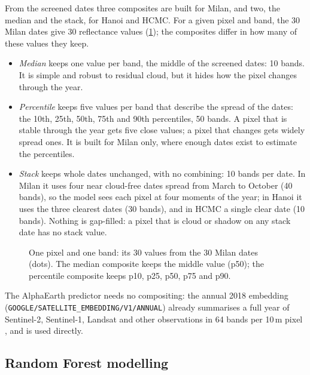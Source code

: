From the screened dates three composites are built for Milan, and two, the
median and the stack, for Hanoi and HCMC. For a given pixel and band, the 30
Milan dates give 30 reflectance values (\cref{fig:onepixel}); the composites
differ in how many of these values they keep.

\begin{itemize}
  \item \emph{Median} keeps one value per band, the middle of the screened
  dates: 10 bands. It is simple and robust to residual cloud, but it hides
  how the pixel changes through the year.
  \item \emph{Percentile} keeps five values per band that describe the
  spread of the dates: the 10th, 25th, 50th, 75th and 90th percentiles,
  50 bands. A pixel that is stable through the year gets five close values; a
  pixel that changes gets widely spread ones. It is built for Milan only,
  where enough dates exist to estimate the percentiles.
  \item \emph{Stack} keeps whole dates unchanged, with no combining: 10
  bands per date. In Milan it uses four near cloud-free dates spread from
  March to October (40 bands), so the model sees each pixel at four moments
  of the year; in Hanoi it uses the three clearest dates (30 bands), and in
  HCMC a single clear date (10 bands). Nothing is gap-filled: a pixel that is
  cloud or shadow on any stack date has no stack value.
\end{itemize}

\begin{figure}[htbp]
  \centering
  \caption{One pixel and one band: its 30 values from the 30 Milan dates
  (dots). The median composite keeps the middle value (p50); the percentile
  composite keeps p10, p25, p50, p75 and p90.}
  \label{fig:onepixel}
\end{figure}

The AlphaEarth predictor needs no compositing: the annual 2018 embedding
(\texttt{GOOGLE/SATELLITE\_EMBEDDING/V1/ANNUAL}) already summarises a full
year of Sentinel-2, Sentinel-1, Landsat and other observations in 64 bands
per 10\,m pixel \cite{brown2025alphaearth}, and is used directly.

\subsection{Random Forest modelling}
\label{sec:rf}

